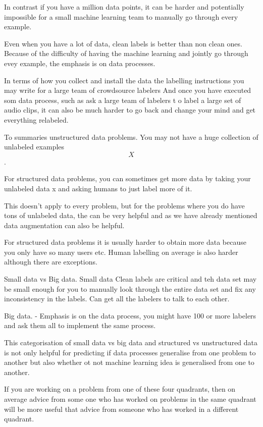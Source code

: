 In contrast if you have a million data points, it can be harder and potentially impossible for a small machine learning team to manually go through every example.

Even when you have a lot of data, clean labels is better than non clean ones.
Because of the difficulty of having the machine learning and jointly go through evey example, the emphasis is on data processes.

In terms of how you collect and install the data the labelling instructions you may write for a large team of crowdsource labelers
And once you have executed som data process, such as ask a large team of labelers t o label a large set of audio clips, it can also be much harder to go back and change your mind and get everything relabeled.


To summaries unstructured data problems.
You may not have a huge collection of unlabeled examples $$X$$.

For structured data problems, you can sometimes get more data by taking your unlabeled data x and asking humans to just label more of it.

This doesn't apply to every problem, but for the problems where you do have tons of unlabeled data, the can be very helpful and as we have already mentioned data augmentation can also be helpful.

For structured data problems it is usually harder to obtain more data because you only have so many users etc.
Human labelling on average is also harder although there are exceptions.

Small data vs Big data.
Small data
Clean labels are critical and teh data set may be small enough for you to manually look through the entire data set and fix any inconsistency in the labels.
 Can get all the labelers to talk to each other.

Big data.
- Emphasis is on the data process, you might have 100 or more labelers and ask them all to implement the same process.


This categorisation of small data vs big data and structured vs unstructured data is not only helpful for predicting if data processes generalise from one problem to another but also whether ot not machine learning idea is generalised from one to another.

If you are working on a problem from one of these four quadrants, then on average advice from some one who has worked on problems in the same quadrant will be more useful that advice from someone who has worked in a different quadrant.

